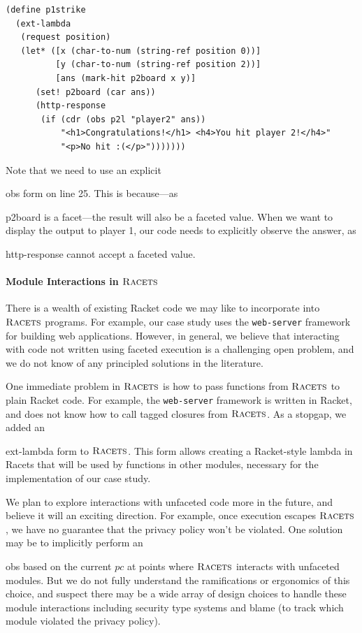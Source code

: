 \documentclass[review=true,acmlarge]{acmart}
\newcommand*{\SavedLstInline}{}
\DeclareRobustCommand*{\lstinline}{%
  \ifmmode
    \let\SavedBGroup\bgroup
    \def\bgroup{%
      \let\bgroup\SavedBGroup
      \hbox\bgroup
    }%
  \fi
  \SavedLstInline
}
\newcommand{\rmth}[1] {{\color{colorFAC} $#1$}}
\newcommand{\code}[1]{\lstinline{#1}}
\newcommand{\racets}[0]{$\textsc{Racets}$\xspace}
\begin{document}
\begin{lstlisting}[language=Racket,escapechar=|,name=case]
(define p1strike
  (ext-lambda
   (request position)
   (let* ([x (char-to-num (string-ref position 0))]
          [y (char-to-num (string-ref position 2))]
          [ans (mark-hit p2board x y)]
      (set! p2board (car ans))
      (http-response
       (if (cdr (obs p2l "player2" ans))
           "<h1>Congratulations!</h1> <h4>You hit player 2!</h4>"
           "<p>No hit :(</p>")))))))
\end{lstlisting}

Note that we need to use an explicit \code{obs} form on
line 25. This is because---as \code{p2board} is
a facet---the result will also be a faceted value. When we want to
display the output to player 1, our code needs to explicitly observe
the answer, as \code{http-response} cannot accept a faceted value.

\paragraph*{Module Interactions in \racets}

There is a wealth of existing Racket code we may like to incorporate
into \racets programs. For example, our case study uses the
\texttt{web-server} framework for building web applications. However,
in general, we believe that interacting with code not written using
faceted execution is a challenging open problem, and we do not know of any
principled solutions in the literature.

One immediate problem in \racets is how to pass functions from \racets
to plain Racket code. For example, the \texttt{web-server} framework
is written in Racket, and does not know how to call tagged closures
from \racets. As a stopgap, we added an \code{ext-lambda} form to
\racets. This form allows creating a Racket-style lambda in Racets
that will be used by functions in other modules, necessary for the
implementation of our case study.

We plan to explore interactions with unfaceted code more in the
future, and believe it will an exciting direction. For example, once
execution escapes \racets, we have no guarantee that the privacy
policy won't be violated. One solution may be to implicitly perform an
\code{obs} based on the current \rmth{pc} at points where \racets
interacts with unfaceted modules. But we do not fully understand the
ramifications or ergonomics of this choice, and suspect there may be a
wide array of design choices to handle these module interactions
including security type systems and blame (to track which module
violated the privacy policy).
\end{document}
